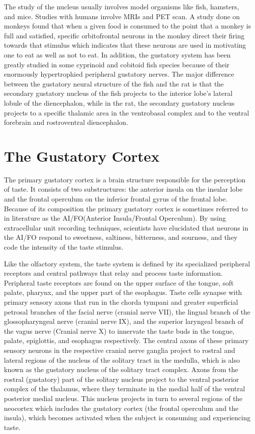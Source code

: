 \documentclass[]{book}
\begin{document}
The study of the nucleus usually involves model organisms like fish, hamsters, and mice. Studies with humans involve MRIs and PET scan. A study done on monkeys found that when a given food is consumed to the point that a monkey is full and satisfied, specific orbitofrontal neurons in the monkey direct their firing towards that stimulus which indicates that these neurons are used in motivating one to eat as well as not to eat. In addition, the gustatory system has been greatly studied in some cyprinoid and cobitoid fish species because of their enormously hypertrophied peripheral gustatory nerves. The major difference between the gustatory neural structure of the fish and the rat is that the secondary gustatory nucleus of the fish projects to the interior lobe's lateral lobule of the diencephalon, while in the rat, the secondary gustatory nucleus projects to a specific thalamic area in the ventrobasal complex and to the ventral forebrain and rostroventral diencephalon.

\hypertarget{the-gustatory-cortex}{%
\section{The Gustatory Cortex}\label{the-gustatory-cortex}}

The primary gustatory cortex is a brain structure responsible for the perception of taste. It consists of two substructures: the anterior insula on the insular lobe and the frontal operculum on the inferior frontal gyrus of the frontal lobe. Because of its composition the primary gustatory cortex is sometimes referred to in literature as the AI/FO(Anterior Insula/Frontal Operculum). By using extracellular unit recording techniques, scientists have elucidated that neurons in the AI/FO respond to sweetness, saltiness, bitterness, and sourness, and they code the intensity of the taste stimulus.

Like the olfactory system, the taste system is defined by its specialized peripheral receptors and central pathways that relay and process taste information. Peripheral taste receptors are found on the upper surface of the tongue, soft palate, pharynx, and the upper part of the esophagus. Taste cells synapse with primary sensory axons that run in the chorda tympani and greater superficial petrosal branches of the facial nerve (cranial nerve VII), the lingual branch of the glossopharyngeal nerve (cranial nerve IX), and the superior laryngeal branch of the vagus nerve (Cranial nerve X) to innervate the taste buds in the tongue, palate, epiglottis, and esophagus respectively. The central axons of these primary sensory neurons in the respective cranial nerve ganglia project to rostral and lateral regions of the nucleus of the solitary tract in the medulla, which is also known as the gustatory nucleus of the solitary tract complex. Axons from the rostral (gustatory) part of the solitary nucleus project to the ventral posterior complex of the thalamus, where they terminate in the medial half of the ventral posterior medial nucleus. This nucleus projects in turn to several regions of the neocortex which includes the gustatory cortex (the frontal operculum and the insula), which becomes activated when the subject is consuming and experiencing taste.
\end{document}
